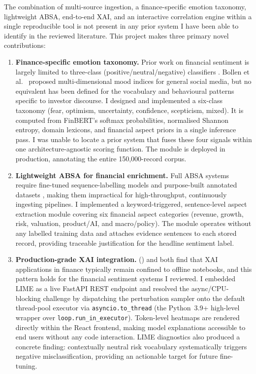 The combination of multi-source ingestion, a finance-specific emotion
taxonomy, lightweight ABSA, end-to-end XAI, and an interactive correlation
engine within a single reproducible tool is not present in any prior system I
have been able to identify in the reviewed literature. This project makes
three primary novel contributions:

\begin{enumerate}

    \item \textbf{Finance-specific emotion taxonomy.}
    Prior work on financial sentiment is largely limited to three-class
    (positive/neutral/negative) classifiers \citep{araci2019finbert,
    malo2014financialphrasebank}. Bollen et al.\ \citep{bollen2011twitter}
    proposed multi-dimensional mood indices for general social media, but no
    equivalent has been defined for the vocabulary and behavioural patterns
    specific to investor discourse.
    I designed and implemented a six-class taxonomy (fear, optimism, uncertainty,
    confidence, scepticism, mixed). It is computed from FinBERT's softmax
    probabilities, normalised Shannon entropy, domain lexicons, and financial
    aspect priors in a single inference pass. I was unable to locate a prior
    system that fuses these four signals within one architecture-agnostic
    scoring function. The module is deployed in production, annotating the
    entire 150{,}000-record corpus.

    \item \textbf{Lightweight ABSA for financial enrichment.}
    Full ABSA systems require fine-tuned sequence-labelling models and
    purpose-built annotated datasets \citep{pontiki2014semeval}, making them
    impractical for high-throughput, continuously ingesting pipelines.
    I implemented a keyword-triggered, sentence-level aspect extraction module
    covering six financial aspect categories (revenue, growth, risk, valuation,
    product/AI, and macro/policy). The module operates without any labelled
    training data and attaches evidence sentences to each stored record,
    providing traceable justification for the headline sentiment label.

    \item \textbf{Production-grade XAI integration.}
    \citeauthor{yeo2023xai} (\citeyear{yeo2023xai}) and \citet{biswas2024xai}
    both find that XAI applications in finance typically remain confined to
    offline notebooks, and this pattern holds for the financial sentiment
    systems I reviewed. I embedded LIME \citep{ribeiro2016lime} as a live FastAPI REST
    endpoint and resolved the async/CPU-blocking challenge by dispatching the
    perturbation sampler onto the default thread-pool executor via
    \texttt{asyncio.to\_thread} (the Python~3.9+ high-level wrapper over
    \texttt{loop.run\_in\_executor}). Token-level heatmaps are rendered directly
    within the React frontend, making model explanations accessible to end
    users without any code interaction. LIME diagnostics also produced a
    concrete finding: contextually neutral risk vocabulary systematically
    triggers negative misclassification, providing an actionable target for
    future fine-tuning.


\end{enumerate}
